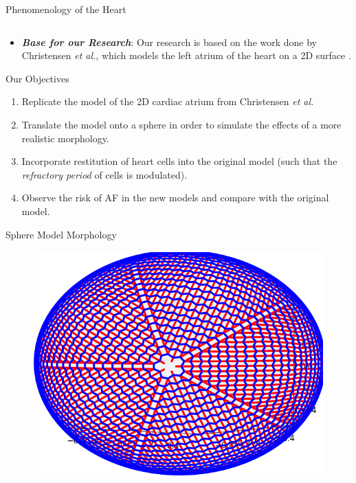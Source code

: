 \documentclass[final,hyperref={pdfpagelabels=false}]{beamer}
\begin{document}
\begin{frame}[t]
\begin{columns}[t]
\begin{column}{.465\textwidth}
\begin{block}{Phenomenology of the Heart}
\begin{columns}
\begin{column}{.54\textwidth}
	
	
\end{column}

\end{columns}

	\begin{itemize}
	
	
 \item \textbf{\textit{Base for our Research}}: Our research is based on the work done by Christensen \emph{et al.}, which models the left atrium of the heart on a 2D surface \cite{Christensen}.
	\end{itemize}
\end{block}
\begin{block}{Our Objectives}

\begin{enumerate}
\item Replicate the model of the 2D cardiac atrium from Christensen \emph{et al.}
\item  Translate the model onto a sphere in order to simulate the effects of a more realistic morphology. 
\item Incorporate restitution of heart cells into the original model (such that the \textit{refractory period} of cells is modulated).
\item Observe the risk of AF in the new models and compare with the original model.
\end{enumerate}


\end{block}


\begin{block}{Sphere Model Morphology}

\begin{figure}

\begin{columns}
\begin{column}{.67\textwidth}
\includegraphics[width=0.8\linewidth]{connectome}


\end{column}
\end{columns}
\end{figure}
\end{block}
\end{column}
\end{columns}
\end{frame}
\end{document}
